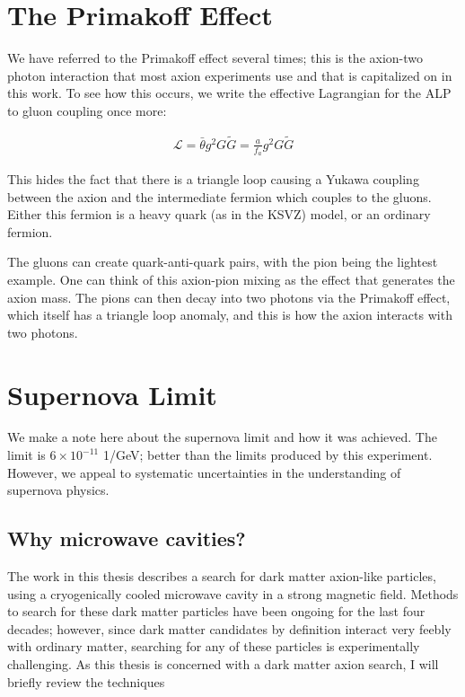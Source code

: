 \documentclass[12pt,twosides]{book}
\begin{document}
\section{The Primakoff Effect}

We have referred to the Primakoff effect several times; this is the axion-two photon interaction that most axion experiments use and that is capitalized on in this work. To see how this occurs, we write the effective Lagrangian for the ALP to gluon coupling once more:

\begin{align*}
\mathcal{L} = \bar \theta g^2 G \tilde G = \frac{a}{f_a} g^2 G \tilde G
\end{align*}

This hides the fact that there is a triangle loop causing a Yukawa coupling between the axion and the intermediate fermion which couples to the gluons. Either this fermion is a heavy quark (as in the KSVZ) model, or an ordinary fermion.

The gluons can create quark-anti-quark pairs, with the pion being the lightest example. One can think of this axion-pion mixing as the effect that generates the axion mass. The pions can then decay into two photons via the Primakoff effect, which itself has a triangle loop anomaly, and this is how the axion interacts with two photons.


\section{Supernova Limit}

We make a note here about the supernova limit and how it was achieved. The limit is $6 \times 10^{-11}$ 1/GeV; better than the limits produced by this experiment. However, we appeal to systematic uncertainties in the understanding of supernova physics.

\subsection{Why microwave cavities?}
The work in this thesis describes a search for dark matter axion-like particles, using a cryogenically cooled microwave cavity in a strong magnetic field. Methods to search for these dark matter particles have been ongoing for the last four decades; however, since dark matter candidates by definition interact very feebly with ordinary matter, searching for any of these particles is experimentally challenging.  As this thesis is concerned with a dark matter axion search, I will briefly review the techniques
\end{document}

